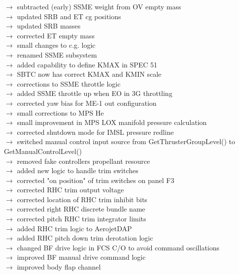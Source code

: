 \documentclass[Space_Shuttle_Vessel_Manual.tex]{subfiles}
\begin{document}
$\rightarrow$ subtracted (early) SSME weight from OV empty mass\\
$\rightarrow$ updated SRB and ET cg positions\\
$\rightarrow$ updated SRB masses\\
$\rightarrow$ corrected ET empty mass\\
$\rightarrow$ small changes to c.g. logic\\
$\rightarrow$ renamed SSME subsystem\\
$\rightarrow$ added capability to define KMAX in SPEC 51\\
$\rightarrow$ SBTC now has correct KMAX and KMIN scale\\
$\rightarrow$ corrections to SSME throttle logic\\
$\rightarrow$ added SSME throttle up when EO in 3G throttling\\
$\rightarrow$ corrected yaw bias for ME-1 out configuration\\
$\rightarrow$ small corrections to MPS He\\
$\rightarrow$ small improvement in MPS LOX manifold pressure calculation\\
$\rightarrow$ corrected shutdown mode for IMSL pressure redline\\
$\rightarrow$ switched manual control input source from GetThrusterGroupLevel() to GetManualControlLevel()\\
$\rightarrow$ removed fake controllers propellant resource\\
$\rightarrow$ added new logic to handle trim switches\\
$\rightarrow$ corrected "on position" of trim switches on panel F3\\
$\rightarrow$ corrected RHC trim output voltage\\
$\rightarrow$ corrected location of RHC trim inhibit bits\\
$\rightarrow$ corrected right RHC discrete bundle name\\
$\rightarrow$ corrected pitch RHC trim integrator limits\\
$\rightarrow$ added RHC trim logic to AerojetDAP\\
$\rightarrow$ added RHC pitch down trim derotation logic\\
$\rightarrow$ changed BF drive logic in FCS C/O to avoid command oscillations\\
$\rightarrow$ improved BF manual drive command logic\\
$\rightarrow$ improved body flap channel\\
\end{document}
